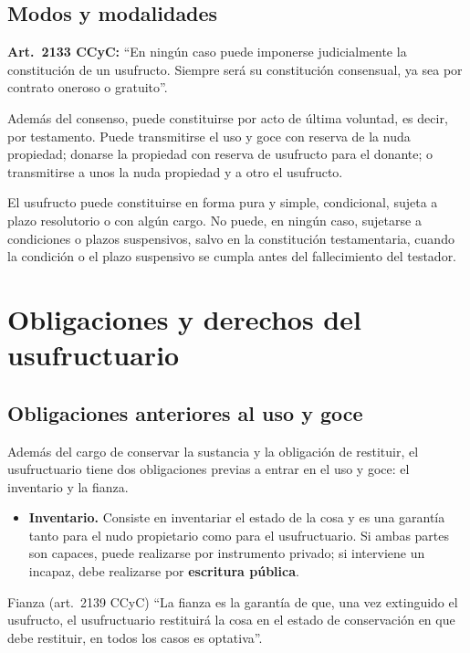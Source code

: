\documentclass[12pt,oneside]{book}
\begin{document}
\subsection{Modos y modalidades}

\begin{importante}
\textbf{Art.~2133 CCyC:} ``En ningún caso puede imponerse judicialmente la constitución de un usufructo. Siempre será su constitución consensual, ya sea por contrato oneroso o gratuito''.
\end{importante}

Además del consenso, puede constituirse por acto de última voluntad, es decir, por testamento. Puede transmitirse el uso y goce con reserva de la nuda propiedad; donarse la propiedad con reserva de usufructo para el donante; o transmitirse a unos la nuda propiedad y a otro el usufructo.

El usufructo puede constituirse en forma pura y simple, condicional, sujeta a plazo resolutorio o con algún cargo. No puede, en ningún caso, sujetarse a condiciones o plazos suspensivos, salvo en la constitución testamentaria, cuando la condición o el plazo suspensivo se cumpla antes del fallecimiento del testador.

\section{Obligaciones y derechos del usufructuario}

\subsection{Obligaciones anteriores al uso y goce}

Además del cargo de conservar la sustancia y la obligación de restituir, el usufructuario tiene dos obligaciones previas a entrar en el uso y goce: el inventario y la fianza.

\begin{itemize}
    \item \textbf{Inventario.} Consiste en inventariar el estado de la cosa y es una garantía tanto para el nudo propietario como para el usufructuario. Si ambas partes son capaces, puede realizarse por instrumento privado; si interviene un incapaz, debe realizarse por \textbf{escritura pública}.
\end{itemize}

\begin{definicion}{Fianza (art.~2139 CCyC)}
``La fianza es la garantía de que, una vez extinguido el usufructo, el usufructuario restituirá la cosa en el estado de conservación en que debe restituir, en todos los casos es optativa''.
\end{definicion}
\end{document}
